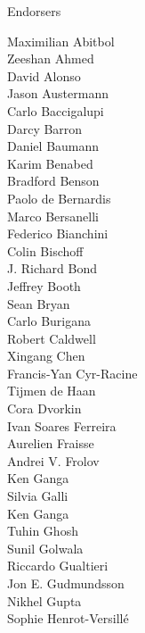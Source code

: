 \documentclass[PICOReport.tex]{subfiles}
\begin{document}
\Large { \centerline {Endorsers}}
%
\footnotesize {
\begin{multicols}{4}
Maximilian Abitbol              \\
Zeeshan Ahmed                   \\
David Alonso                    \\
Jason Austermann                \\
Carlo Baccigalupi               \\
Darcy Barron                    \\
Daniel Baumann                  \\
Karim Benabed                   \\
Bradford Benson                 \\
Paolo de Bernardis              \\
Marco Bersanelli                \\
Federico Bianchini              \\
Colin Bischoff                  \\
J. Richard Bond                 \\
Jeffrey Booth                   \\
Sean Bryan                      \\
Carlo Burigana                  \\
Robert Caldwell                 \\
Xingang Chen                    \\
Francis-Yan Cyr-Racine          \\
Tijmen de Haan                  \\
Cora Dvorkin                    \\
Ivan Soares Ferreira            \\
Aurelien Fraisse                \\
Andrei V. Frolov                \\
Ken Ganga                       \\
Silvia Galli                    \\
Ken Ganga                       \\
Tuhin Ghosh                     \\
Sunil Golwala                   \\
Riccardo Gualtieri              \\
Jon E. Gudmundsson              \\
Nikhel Gupta                    \\
Sophie Henrot-Versill\'e        \\

\end{multicols}}
\end{document}
